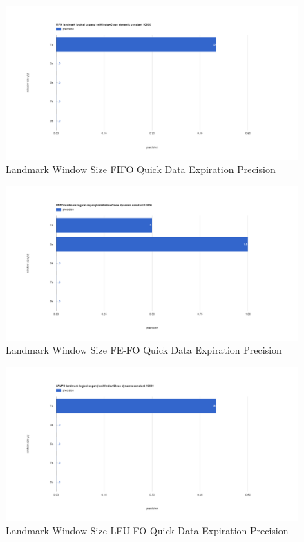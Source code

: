 \begin{figure}[!htbp]
	\centering
    \includegraphics[width=\textwidth]{img/app3-land-ws-fifo-quick-p.png}
    \caption{Landmark Window Size FIFO Quick Data Expiration Precision}
\end{figure}
\begin{figure}[!htbp]
	\centering
    \includegraphics[width=\textwidth]{img/app3-land-ws-fefo-quick-p.png}
    \caption{Landmark Window Size FE-FO Quick Data Expiration Precision}
\end{figure}
\begin{figure}[!htbp]
	\centering
    \includegraphics[width=\textwidth]{img/app3-land-ws-lfufo-quick-p.png}
    \caption{Landmark Window Size LFU-FO Quick Data Expiration Precision}
\end{figure}
